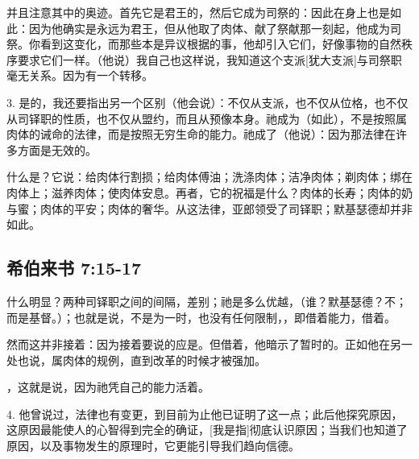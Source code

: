并且注意其中的奥迹。首先它是君王的，然后它成为司祭的：因此在身上也是如此：因为他确实是永远为君王，但从他取了肉体、献了祭献那一刻起，他成为司祭。你看到这变化，而那些本是异议根据的事，他却引入它们，好像事物的自然秩序要求它们一样。（他说）我自己也这样说，我知道这个支派[犹大支派]与司祭职毫无关系。因为有一个转移。\par

3. 是的，我还要指出另一个区别（他会说）：不仅从支派，也不仅从位格，也不仅从司铎职的性质，也不仅从盟约，而且从预像本身。祂成为（如此），不是按照属肉体的诫命的法律，而是按照无穷生命的能力。祂成了（他说）：因为那法律在许多方面是无效的。\par

什么是？它说：给肉体行割损；给肉体傅油；洗涤肉体；洁净肉体；剃肉体；绑在肉体上；滋养肉体；使肉体安息。再者，它的祝福是什么？肉体的长寿；肉体的奶与蜜；肉体的平安；肉体的奢华。从这法律，亚郎领受了司铎职；默基瑟德却并非如此。\par


\subsection{希伯来书 7:15-17}

 什么明显？两种司铎职之间的间隔，差别；祂是多么优越，（谁？默基瑟德？不；而是基督。）；也就是说，不是为一时，也没有任何限制，，即借着能力，借着。\par

然而这并非接着：因为接着要说的应是。但借着，他暗示了暂时的。正如他在另一处也说，属肉体的规例，直到改革的时候才被强加。\par

，这就是说，因为祂凭自己的能力活着。\par

4. 他曾说过，法律也有变更，到目前为止他已证明了这一点；此后他探究原因，这原因最能使人的心智得到完全的确证，[我是指]彻底认识原因；当我们也知道了原因，以及事物发生的原理时，它更能引导我们趋向信德。\par


